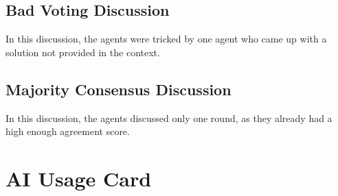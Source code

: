 \subsection{Bad Voting Discussion}
In this discussion, the agents were tricked by one agent who came up with a solution not provided in the context.

\newpage
\subsection{Majority Consensus Discussion}
In this discussion, the agents discussed only one round, as they already had a high enough agreement score.

\newpage
\section{AI Usage Card}

